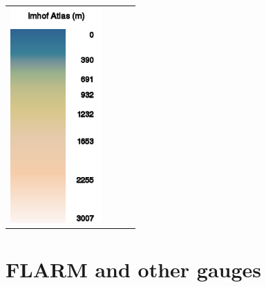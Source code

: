 \begin{maxipage}
\begin{longtable}{c c c c}
\includegraphics[angle=0,width=3.5cm,keepaspectratio='true']{figures/ramp-terrain-imhofatlas.png}
\\
\end{longtable}
\end{maxipage}


\clearpage
\section{FLARM and other gauges}\label{sec:other-gauge}


